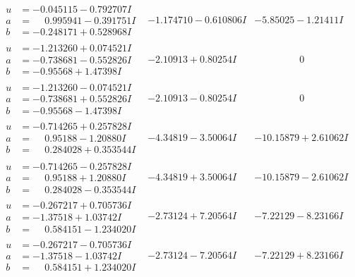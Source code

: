 \documentclass[1p]{elsarticle_modified}
\theoremstyle{definition}
\begin{document}
$$\begin{array}{c|c|c}
\begin{aligned}
u &= -0.045115 - 0.792707 I \\
a &= \phantom{-}0.995941 - 0.391751 I \\
b &= -0.248171 + 0.528968 I\end{aligned}
 & -1.174710 - 0.610806 I & -5.85025 - 1.21411 I \\ \hline\begin{aligned}
u &= -1.213260 + 0.074521 I \\
a &= -0.738681 - 0.552826 I \\
b &= -0.95568 + 1.47398 I\end{aligned}
 & -2.10913 + 0.80254 I & \phantom{-0.000000 } 0 \\ \hline\begin{aligned}
u &= -1.213260 - 0.074521 I \\
a &= -0.738681 + 0.552826 I \\
b &= -0.95568 - 1.47398 I\end{aligned}
 & -2.10913 - 0.80254 I & \phantom{-0.000000 } 0 \\ \hline\begin{aligned}
u &= -0.714265 + 0.257828 I \\
a &= \phantom{-}0.95188 - 1.20880 I \\
b &= \phantom{-}0.284028 + 0.353544 I\end{aligned}
 & -4.34819 - 3.50064 I & -10.15879 + 2.61062 I \\ \hline\begin{aligned}
u &= -0.714265 - 0.257828 I \\
a &= \phantom{-}0.95188 + 1.20880 I \\
b &= \phantom{-}0.284028 - 0.353544 I\end{aligned}
 & -4.34819 + 3.50064 I & -10.15879 - 2.61062 I \\ \hline\begin{aligned}
u &= -0.267217 + 0.705736 I \\
a &= -1.37518 + 1.03742 I \\
b &= \phantom{-}0.584151 - 1.234020 I\end{aligned}
 & -2.73124 + 7.20564 I & -7.22129 - 8.23166 I \\ \hline\begin{aligned}
u &= -0.267217 - 0.705736 I \\
a &= -1.37518 - 1.03742 I \\
b &= \phantom{-}0.584151 + 1.234020 I\end{aligned}
 & -2.73124 - 7.20564 I & -7.22129 + 8.23166 I \\ \hline\begin{aligned}

\end{aligned}
\end{array}$$
\end{document}
